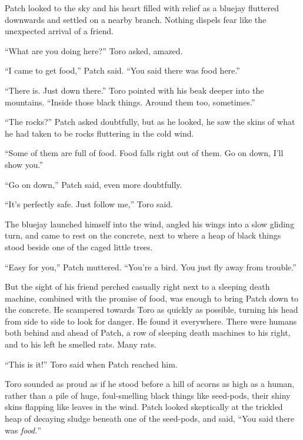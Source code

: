 \documentclass[ebook,oneside,openany,17pt]{memoir}
\newenvironment{tolerant}[1]{%
  \par\tolerance=#1\relax
}{%
  \par
}
\begin{document}
Patch looked to the sky and his heart filled with relief as a bluejay
fluttered downwards and settled on a nearby branch. Nothing dispels
fear like the unexpected arrival of a friend.

“What are you doing here?” Toro asked, amazed.

“I came to get food,” Patch said. “You said there was food here.”

“There is. Just down there.” Toro pointed with his beak deeper into
the mountains. “Inside those black things. Around them too,
sometimes.”

“The rocks?” Patch asked doubtfully, but as he looked, he saw the
skins of what he had taken to be rocks fluttering in the cold wind.

“Some of them are full of food. Food falls right out of them. Go on
down, I’ll show you.”

“Go on down,” Patch said, even more doubtfully.

“It’s perfectly safe. Just follow me,” Toro said.

The bluejay launched himself into the wind, angled his wings into a
slow gliding turn, and came to rest on the concrete, next to where a
heap of black things stood beside one of the caged little trees.

“Easy for you,” Patch muttered. “You’re a bird. You just fly away from
trouble.”

\begin{tolerant}{700}
But the sight of his friend perched casually right next to a sleeping
death machine, combined with the promise of food, was enough to bring
Patch down to the concrete. He scampered towards Toro as quickly as
possible, turning his head from side to side to look for danger. He
found it everywhere. There were humans both behind and ahead of Patch,
a row of sleeping death machines to his right, and to his left he
smelled rats. Many rats.
\end{tolerant}

“This is it!” Toro said when Patch reached him.

\begin{tolerant}{500}
Toro sounded as proud as if he stood before a hill of acorns as high
as a human, rather than a pile of huge, foul-smelling black things
like seed-pods, their shiny skins flapping like leaves in the
wind. Patch looked skeptically at the trickled heap of decaying sludge
beneath one of the seed-pods, and said, “You said there was
\emph{food.}”
\end{tolerant}
\end{document}
